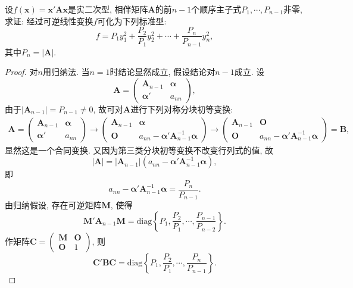 \documentclass[../../main.tex]{subfiles}
\begin{document}
\begin{proposition}\label{proposition:利用顺序主子式计算二次型的标准型}
设$f(\boldsymbol{x}) = \boldsymbol{x}'\boldsymbol{A}\boldsymbol{x}$是实二次型, 相伴矩阵$\boldsymbol{A}$的前$n - 1$个顺序主子式$P_1, \cdots, P_{n - 1}$非零, 求证: 经过可逆线性变换$f$可化为下列标准型:
\[
f = P_1y_1^2 + \frac{P_2}{P_1}y_2^2 + \cdots + \frac{P_n}{P_{n - 1}}y_n^2,
\]
其中$P_n = |\boldsymbol{A}|$.
\end{proposition}
\begin{proof}
对$n$用归纳法. 当$n = 1$时结论显然成立, 假设结论对$n - 1$成立. 设
\[
\boldsymbol{A}=\begin{pmatrix}
\boldsymbol{A}_{n - 1} & \boldsymbol{\alpha} \\
\boldsymbol{\alpha}' & a_{nn}
\end{pmatrix},
\]
由于$|\boldsymbol{A}_{n - 1}| = P_{n - 1}\neq 0$, 故可对$\boldsymbol{A}$进行下列对称分块初等变换:
\begin{align*}
\boldsymbol{A}=\begin{pmatrix}
\boldsymbol{A}_{n - 1} & \boldsymbol{\alpha} \\
\boldsymbol{\alpha}' & a_{nn}
\end{pmatrix}
\rightarrow
\begin{pmatrix}
\boldsymbol{A}_{n - 1} & \boldsymbol{\alpha} \\
\boldsymbol{O} & a_{nn}-\boldsymbol{\alpha}'\boldsymbol{A}_{n - 1}^{-1}\boldsymbol{\alpha}
\end{pmatrix}
\rightarrow
\begin{pmatrix}
\boldsymbol{A}_{n - 1} & \boldsymbol{O} \\
\boldsymbol{O} & a_{nn}-\boldsymbol{\alpha}'\boldsymbol{A}_{n - 1}^{-1}\boldsymbol{\alpha}
\end{pmatrix}
=\boldsymbol{B},
\end{align*}
显然这是一个合同变换. 又因为第三类分块初等变换不改变行列式的值, 故
\[
|\boldsymbol{A}| = |\boldsymbol{A}_{n - 1}|(a_{nn}-\boldsymbol{\alpha}'\boldsymbol{A}_{n - 1}^{-1}\boldsymbol{\alpha}),
\]
即
\[
a_{nn}-\boldsymbol{\alpha}'\boldsymbol{A}_{n - 1}^{-1}\boldsymbol{\alpha}=\frac{P_n}{P_{n - 1}}.
\]
由归纳假设, 存在可逆矩阵$\boldsymbol{M}$, 使得
\[
\boldsymbol{M}'\boldsymbol{A}_{n - 1}\boldsymbol{M}=\text{diag}\left\{P_1, \frac{P_2}{P_1}, \cdots, \frac{P_{n - 1}}{P_{n - 2}}\right\}.
\]
作矩阵$\boldsymbol{C}=\begin{pmatrix}
\boldsymbol{M} & \boldsymbol{O} \\
\boldsymbol{O} & 1
\end{pmatrix}$, 则
\[
\boldsymbol{C}'\boldsymbol{B}\boldsymbol{C}=\text{diag}\left\{P_1, \frac{P_2}{P_1}, \cdots, \frac{P_n}{P_{n - 1}}\right\}. 
\] 

\end{proof}
\end{document}
